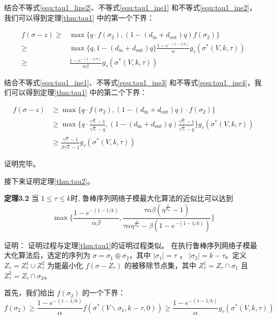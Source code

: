 结合不等式\ref{equ:tau1_line2}、不等式\ref{equ:tau1_ine1} 和不等式\ref{equ:tau1_ine2}，我们可以得到定理\ref{thm:tau1} 中的第一个下界：

\begin{align}
    f(\sigma -z ) \ge & \max\{ q \cdot f(\sigma_2),(1-(d_{\text{in}} + d_{\text{out}})q) f(\sigma_2)\} \\
    \ge & \max\{q,1-(d_{\text{in}} + d_{\text{out}})q\} \frac{1-e^{-(1-1/k)}}{\alpha} g_\tau(\sigma^*(V,k,\tau)) \\
    \ge & \frac{1-e^{-(1-1/k)}}{\alpha\beta} g_\tau(\sigma^*(V,k,\tau))
\end{align}

结合不等式\ref{equ:tau1_ine1}、不等式\ref{equ:tau1_ine3} 和不等式\ref{equ:tau1_ine4}，我们可以得到定理\ref{thm:tau1} 中的第二个下界：

\begin{align}
     f(\sigma -z ) & \ge \max\{ q \cdot f(\sigma_2),(1-(d_{\text{in}} + d_{\text{out}})q) \cdot f(\sigma_2)\} \\
    & \ge \max\{ q \cdot \frac{\gamma^{\frac{1}{d_{\text{in}}}}-1}{\gamma^{\frac{1}{d_{\text{in}}}}-q} , (1-(d_{\text{in}} + d_{\text{out}})q) \frac{\gamma^{\frac{1}{d_{\text{in}}}}-1}{\gamma^{\frac{1}{d_{\text{in}}}}-q} \} g_\tau(\sigma^*(V,k,\tau)) \\
    & \ge \frac{\gamma^{\frac{1}{d_{\text{in}}}}-1}{\beta \gamma^{\frac{1}{d_{\text{in}}}}-1} g_\tau(\sigma^*(V,k,\tau))
\end{align}

证明完毕。


接下来证明定理\ref{thm:tau2}。

\noindent \textbf{定理3.2} 当 $1\le \tau \le k$时, 鲁棒序列网络子模最大化算法的近似比可以达到
\begin{equation*}
 \max\{\frac{1-e^{-(1-1/k)}}{\alpha\beta},\frac{\tau\alpha\beta(\eta^{\frac{1}{d_{\text{in}}}}-1)}{\tau\alpha\eta^{\frac{1}{d_{\text{in}}}}- \beta (1-e^{-(1-1/k)}) }\}   
\end{equation*}

证明：
证明过程与定理\ref{thm:tau1}的证明过程类似。
在执行鲁棒序列网络子模最大化算法后，选定的序列为 $\sigma=\sigma_1 \oplus \sigma_2$，其中 $|\sigma_1|=\tau$ ， $|\sigma_2|=k-\tau$。定义 $Z_{\tau} = Z_{\tau}^1 \cup Z_{\tau}^2$ 为能最小化 $f(\sigma-Z_{\tau})$ 的被移除节点集，其中 $Z_{\tau}^1 = Z_{\tau} \cap \sigma_1$ 且 $Z_{\tau}^2 = Z_{\tau} \cap \sigma_2$。

首先，我们给出 $f(\sigma_2)$ 的一个下界：
\begin{equation}
    f(\sigma_2) \ge \frac{1-e^{-(1-1/k)}}{\alpha} f(\sigma^*(V\backslash \sigma_1,k-\tau,0)) \ge \frac{1-e^{-(1-1/k)}}{\alpha} g_\tau(\sigma^*(V,k,\tau)) \label{equ:tau2_line1}
\end{equation}

